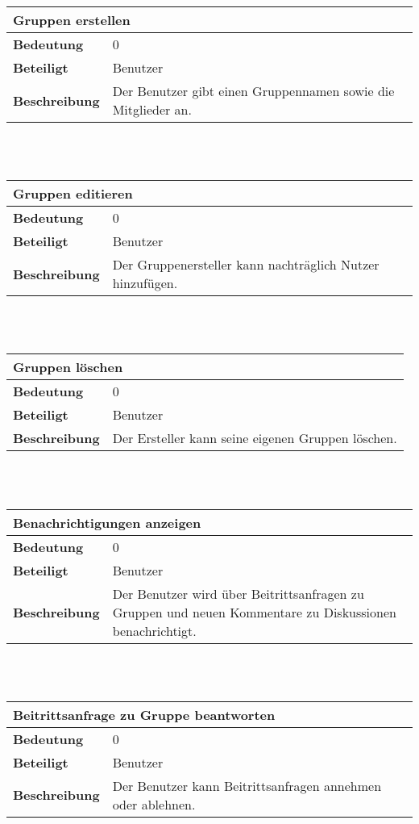 \documentclass[12pt,a4paper]{article}
\begin{document}
\begin{tabular}{l p{10cm}}
\multicolumn{2}{l}{\textbf{Gruppen erstellen}} \\ \hline
\textbf{Bedeutung} & 0 \\ \hline 
\textbf{Beteiligt} & Benutzer \\ \hline 
\textbf{Beschreibung} & Der Benutzer gibt einen Gruppennamen sowie die Mitglieder an.\\ 
\hline 
\end{tabular}\\\\

\begin{tabular}{l p{10cm}}
\multicolumn{2}{l}{\textbf{Gruppen editieren}} \\ \hline
\textbf{Bedeutung} & 0 \\ \hline 
\textbf{Beteiligt} & Benutzer \\ \hline 
\textbf{Beschreibung} & Der Gruppenersteller kann nachträglich Nutzer hinzufügen.\\ 
\hline 
\end{tabular}\\\\

\begin{tabular}{l p{10cm}}
\multicolumn{2}{l}{\textbf{Gruppen löschen}} \\ \hline
\textbf{Bedeutung} & 0 \\ \hline 
\textbf{Beteiligt} & Benutzer \\ \hline 
\textbf{Beschreibung} & Der Ersteller kann seine eigenen Gruppen löschen.\\ 
\hline 
\end{tabular}\\\\

\begin{tabular}{l p{10cm}}
\multicolumn{2}{l}{\textbf{Benachrichtigungen anzeigen}} \\ \hline
\textbf{Bedeutung} & 0 \\ \hline 
\textbf{Beteiligt} & Benutzer \\ \hline 
\textbf{Beschreibung} & Der Benutzer wird über Beitrittsanfragen zu Gruppen und neuen Kommentare zu Diskussionen benachrichtigt.\\ 
\hline 
\end{tabular}\\\\

\begin{tabular}{l p{10cm}}
\multicolumn{2}{l}{\textbf{Beitrittsanfrage zu Gruppe beantworten}} \\ \hline
\textbf{Bedeutung} & 0 \\ \hline 
\textbf{Beteiligt} & Benutzer \\ \hline 
\textbf{Beschreibung} & Der Benutzer kann Beitrittsanfragen annehmen oder ablehnen.\\ 
\hline 
\end{tabular}\\\\
\end{document}
